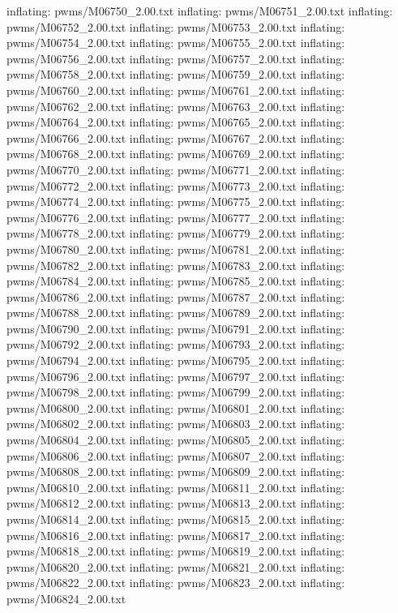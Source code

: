 \documentclass[letterpaper,10pt,english]{sphinxmanual}
\begin{document}
{\begin{sphinxVerbatim}[commandchars=\\\{\}]
  inflating: pwms/M06750\_2.00.txt
  inflating: pwms/M06751\_2.00.txt
  inflating: pwms/M06752\_2.00.txt
  inflating: pwms/M06753\_2.00.txt
  inflating: pwms/M06754\_2.00.txt
  inflating: pwms/M06755\_2.00.txt
  inflating: pwms/M06756\_2.00.txt
  inflating: pwms/M06757\_2.00.txt
  inflating: pwms/M06758\_2.00.txt
  inflating: pwms/M06759\_2.00.txt
  inflating: pwms/M06760\_2.00.txt
  inflating: pwms/M06761\_2.00.txt
  inflating: pwms/M06762\_2.00.txt
  inflating: pwms/M06763\_2.00.txt
  inflating: pwms/M06764\_2.00.txt
  inflating: pwms/M06765\_2.00.txt
  inflating: pwms/M06766\_2.00.txt
  inflating: pwms/M06767\_2.00.txt
  inflating: pwms/M06768\_2.00.txt
  inflating: pwms/M06769\_2.00.txt
  inflating: pwms/M06770\_2.00.txt
  inflating: pwms/M06771\_2.00.txt
  inflating: pwms/M06772\_2.00.txt
  inflating: pwms/M06773\_2.00.txt
  inflating: pwms/M06774\_2.00.txt
  inflating: pwms/M06775\_2.00.txt
  inflating: pwms/M06776\_2.00.txt
  inflating: pwms/M06777\_2.00.txt
  inflating: pwms/M06778\_2.00.txt
  inflating: pwms/M06779\_2.00.txt
  inflating: pwms/M06780\_2.00.txt
  inflating: pwms/M06781\_2.00.txt
  inflating: pwms/M06782\_2.00.txt
  inflating: pwms/M06783\_2.00.txt
  inflating: pwms/M06784\_2.00.txt
  inflating: pwms/M06785\_2.00.txt
  inflating: pwms/M06786\_2.00.txt
  inflating: pwms/M06787\_2.00.txt
  inflating: pwms/M06788\_2.00.txt
  inflating: pwms/M06789\_2.00.txt
  inflating: pwms/M06790\_2.00.txt
  inflating: pwms/M06791\_2.00.txt
  inflating: pwms/M06792\_2.00.txt
  inflating: pwms/M06793\_2.00.txt
  inflating: pwms/M06794\_2.00.txt
  inflating: pwms/M06795\_2.00.txt
  inflating: pwms/M06796\_2.00.txt
  inflating: pwms/M06797\_2.00.txt
  inflating: pwms/M06798\_2.00.txt
  inflating: pwms/M06799\_2.00.txt
  inflating: pwms/M06800\_2.00.txt
  inflating: pwms/M06801\_2.00.txt
  inflating: pwms/M06802\_2.00.txt
  inflating: pwms/M06803\_2.00.txt
  inflating: pwms/M06804\_2.00.txt
  inflating: pwms/M06805\_2.00.txt
  inflating: pwms/M06806\_2.00.txt
  inflating: pwms/M06807\_2.00.txt
  inflating: pwms/M06808\_2.00.txt
  inflating: pwms/M06809\_2.00.txt
  inflating: pwms/M06810\_2.00.txt
  inflating: pwms/M06811\_2.00.txt
  inflating: pwms/M06812\_2.00.txt
  inflating: pwms/M06813\_2.00.txt
  inflating: pwms/M06814\_2.00.txt
  inflating: pwms/M06815\_2.00.txt
  inflating: pwms/M06816\_2.00.txt
  inflating: pwms/M06817\_2.00.txt
  inflating: pwms/M06818\_2.00.txt
  inflating: pwms/M06819\_2.00.txt
  inflating: pwms/M06820\_2.00.txt
  inflating: pwms/M06821\_2.00.txt
  inflating: pwms/M06822\_2.00.txt
  inflating: pwms/M06823\_2.00.txt
  inflating: pwms/M06824\_2.00.txt

\end{sphinxVerbatim}}
\end{document}
